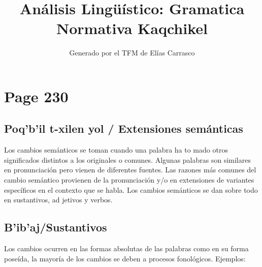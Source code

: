 \documentclass{article}%
\title{Análisis Lingüístico: Gramatica Normativa Kaqchikel}%
\author{Generado por el TFM de Elías Carrasco}%
\begin{document}
%
\normalsize%
\maketitle%
\section{Page 230}%
\label{sec:Page230}%
\subsection{Poq’b’il t{-}xilen yol / Extensiones semánticas}%
\label{subsec:Poqbilt{-}xilenyol/Extensionessemnticas}%

%
Los cambios semánticos se toman cuando una palabra ha to mado otros significados distintos a los originales o comunes. %
Algunas palabras son similares en pronunciación pero vienen %
de diferentes fuentes. %
Las razones más comunes del cambio semántico provienen de %
la pronunciación y/o en extensiones de variantes específicos %
en el contexto que se habla. %
Los cambios semánticos se dan sobre todo en sustantivos, ad jetivos y verbos. %
\subsection{B’ib’aj/Sustantivos}%
\label{subsec:Bibaj/Sustantivos}%

%
Los cambios ocurren en las formas absolutas de las palabras %
como en su forma poseída, la mayoría de los cambios se deben %
a procesos fonológicos. %
Ejemplos: 

%
\end{document}
